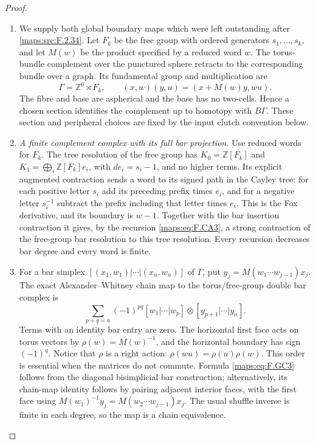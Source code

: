\documentclass[11pt,a4paper]{article}
\theoremstyle{definition}
\begin{document}
\begin{proof}
\begin{enumerate}[label=\arabic*.]
\item We supply both global boundary maps which were left outstanding
after \ref{maps:src:F.2.34}.  Let $F_k$ be the free group with ordered
generators $s_1,\ldots,s_k$, and let $M(w)$ be the product
specified by a reduced word $w$.  The torus-bundle complement
over the punctured sphere retracts to the corresponding bundle
over a graph.  Its fundamental group and multiplication are
\[
 \Gamma=\mathbb Z^6\rtimes F_k,
 \qquad (x,w)(y,u)=(x+M(w)y,wu).                            \tag{F.GC2}\label{maps:eq:F.GC2}
\]
The fibre and base are aspherical and the base has no
two-cells.  Hence a chosen section identifies the complement
up to homotopy with $B\Gamma$.  These section and peripheral
choices are fixed by the input clutch convention below.

\item \emph{A finite complement complex with its full bar projection.}
Use reduced words for $F_k$.  The tree resolution of the free
group has $K_0=\mathbb Z[F_k]$ and
$K_1=\bigoplus_i\mathbb Z[F_k]e_i$, with
$de_i=s_i-1$, and no higher terms.  Its explicit augmented
contraction sends a word to its signed path in the Cayley
tree: for each positive letter $s_i$ add its preceding prefix
times $e_i$, and for a negative letter $s_i^{-1}$ subtract
the prefix including that letter times $e_i$.
This is the Fox derivative, and its boundary is $w-1$.
Together with the bar insertion contraction it gives, by
the recursion \eqref{maps:eq:F.CA3}, a strong contraction of the free-group
bar resolution to this tree resolution.  Every recursion
decreases bar degree and every word is finite.

\item For a bar simplex $[(x_1,w_1)|\cdots|(x_n,w_n)]$ of $\Gamma$,
put $y_j=M(w_1\cdots w_{j-1})x_j$.
The exact Alexander--Whitney chain map to the torus/free-group
double bar complex is
\[
 \sum_{p+q=n}(-1)^{pq}
 [w_1|\cdots|w_p]\otimes[y_{p+1}|\cdots|y_n].              \tag{F.GC3}\label{maps:eq:F.GC3}
\]
Terms with an identity bar entry are zero.  The horizontal
first face acts on torus vectors by
$\rho(w)=M(w)^{-1}$, and the horizontal boundary has sign
$(-1)^q$.  Notice that $\rho$ is a right action:
$\rho(wu)=\rho(u)\rho(w)$.  This order is essential when
the matrices do not commute.  Formula \eqref{maps:eq:F.GC3} follows from
the diagonal bisimplicial bar construction; alternatively,
its chain-map identity follows by pairing adjacent interior
faces, with the first face using
$M(w_1)^{-1}y_j=M(w_2\cdots w_{j-1})x_j$.
The usual shuffle inverse is finite in each degree, so the
map is a chain equivalence.


\end{enumerate}
\end{proof}
\end{document}
